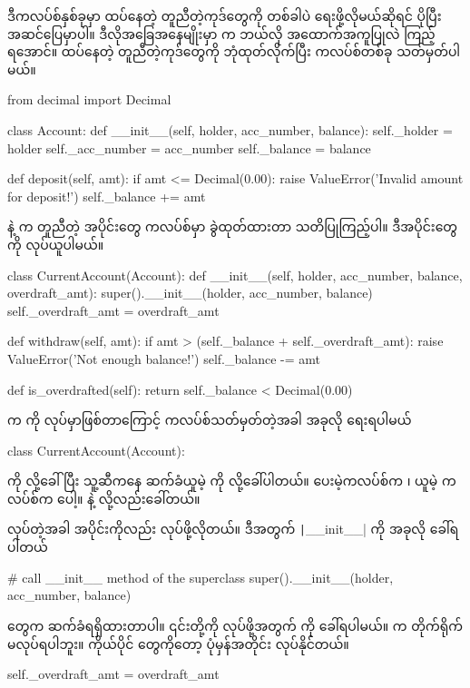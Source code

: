ဒီကလပ်စ်နှစ်ခုမှာ ထပ်နေတဲ့ တူညီတဲ့ကုဒ်တွေကို  တစ်ခါပဲ ရေးဖို့လိုမယ်ဆိုရင် ပိုပြီးအဆင်ပြေမှာပါ။ ဒီလိုအခြေအနေမျိုးမှာ  က ဘယ်လို အထောက်အကူပြုလဲ ကြည့်ရအောင်။ ထပ်နေတဲ့ တူညီတဲ့ကုဒ်တွေကို ဘုံထုတ်လိုက်ပြီး ကလပ်စ်တစ်ခု သတ်မှတ်ပါမယ်။ 
%
\begin{py}
from decimal import Decimal

class Account:
    def __init__(self, holder, acc_number, balance):
        self._holder = holder
        self._acc_number = acc_number
        self._balance = balance

    def deposit(self, amt):
        if amt <= Decimal(0.00):
            raise ValueError('Invalid amount for deposit!')
        self._balance += amt
\end{py}
%
 နဲ့  က  တူညီတဲ့ အပိုင်းတွေ  ကလပ်စ်မှာ ခွဲထုတ်ထားတာ သတိပြုကြည့်ပါ။  ဒီအပိုင်းတွေကို  လုပ်ယူပါမယ်။
%
\begin{py}
class CurrentAccount(Account):
    def __init__(self, holder, acc_number, balance, overdraft_amt):
        super().__init__(holder, acc_number, balance)
        self._overdraft_amt = overdraft_amt

    def withdraw(self, amt):
        if amt > (self._balance + self._overdraft_amt):
            raise ValueError('Not enough balance!')
        self._balance -= amt

    def is_overdrafted(self):
        return self._balance < Decimal(0.00)
\end{py}
%

 က  ကို   လုပ်မှာဖြစ်တာကြောင့် ကလပ်စ်သတ်မှတ်တဲ့အခါ အခုလို ရေးရပါမယ်
%
\begin{py}
class CurrentAccount(Account):
\end{py}
%
 ကို  လို့ခေါ်ပြီး သူ့ဆီကနေ ဆက်ခံယူမဲ့  ကို   လို့ခေါ်ပါတယ်။ ပေးမဲ့ကလပ်စ်က  ၊ ယူမဲ့ ကလပ်စ်က  ပေါ့။  နဲ့  လို့လည်းခေါ်တယ်။

  လုပ်တဲ့အခါ  အပိုင်းကိုလည်း   လုပ်ဖို့လိုတယ်။ ဒီအတွက်  \texttt|__init__| ကို အခုလို ခေါ်ရပါတယ်
%
\begin{py}
# call __init__ method of the superclass
super().__init__(holder, acc_number, balance)
\end{py}
%
\fEn{,} \fEn{,}   တွေက ဆက်ခံရရှိထားတာပါ။ ၎င်းတို့ကို  လုပ်ဖို့အတွက်     ကို ခေါ်ရပါမယ်။  က တိုက်ရိုက် မလုပ်ရပါဘူး။   ကိုယ်ပိုင်  တွေကိုတော့ ပုံမှန်အတိုင်း  လုပ်နိုင်တယ်။
%
\begin{py}
self._overdraft_amt = overdraft_amt
\end{py}
%
 

